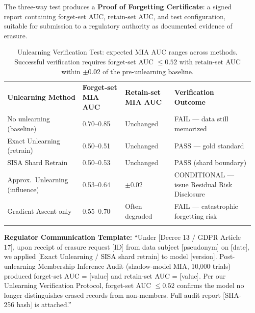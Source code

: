 The three-way test produces a \textbf{Proof of Forgetting Certificate}: a signed report containing forget-set AUC, retain-set AUC, and test configuration, suitable for submission to a regulatory authority as documented evidence of erasure.

\begin{table}[ht]
\centering
\caption{Unlearning Verification Test: expected MIA AUC ranges across methods. Successful verification requires forget-set AUC $\leq 0.52$ with retain-set AUC within $\pm 0.02$ of the pre-unlearning baseline.}
\label{tab:unlearning_verification}
\renewcommand{\arraystretch}{1.3}
\begin{tabular}{p{3.0cm} p{2.6cm} p{2.6cm} p{3.4cm}}
\hline\noalign{\smallskip}
\textbf{Unlearning Method} & \textbf{Forget-set MIA AUC} & \textbf{Retain-set MIA AUC} & \textbf{Verification Outcome} \\
\noalign{\smallskip}\svhline\noalign{\smallskip}
No unlearning (baseline) & 0.70--0.85 & Unchanged & \cellcolor{costhigh}FAIL --- data still memorized \\[3pt]
Exact Unlearning (retrain) & 0.50--0.51 & Unchanged & \cellcolor{costlow}PASS --- gold standard \\[3pt]
SISA Shard Retrain & 0.50--0.53 & Unchanged & \cellcolor{costlow}PASS (shard boundary) \\[3pt]
Approx.\ Unlearning (influence) & 0.53--0.64 & $\pm 0.02$ & \cellcolor{costmed}CONDITIONAL --- issue Residual Risk Disclosure \\[3pt]
Gradient Ascent only & 0.55--0.70 & Often degraded & \cellcolor{costhigh}FAIL --- catastrophic forgetting risk \\
\noalign{\smallskip}\hline\noalign{\smallskip}
\end{tabular}
\end{table}

\begin{svgraybox}
\textbf{Regulator Communication Template:} ``Under [Decree 13 / GDPR Article 17], upon receipt of erasure request [ID] from data subject [pseudonym] on [date], we applied [Exact Unlearning / SISA shard retrain] to model [version]. Post-unlearning Membership Inference Audit (shadow-model MIA, 10{,}000 trials) produced forget-set AUC = [value] and retain-set AUC = [value]. Per our Unlearning Verification Protocol, forget-set AUC $\leq 0.52$ confirms the model no longer distinguishes erased records from non-members. Full audit report [SHA-256 hash] is attached.''
\end{svgraybox}

